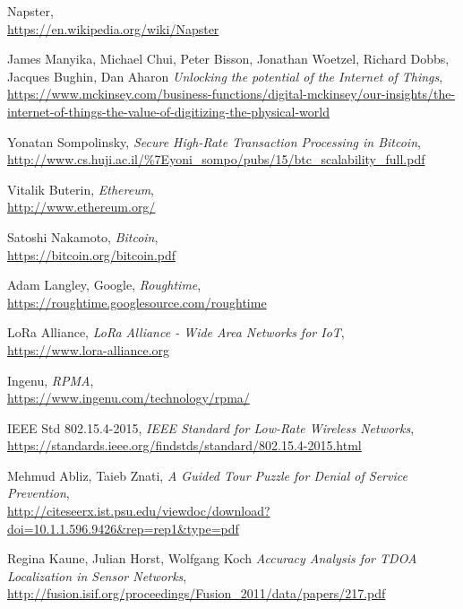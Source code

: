 \documentclass[letterpaper,11pt]{article}
\begin{document}
\begin{thebibliography}{9}

    Napster, \\
        \url{https://en.wikipedia.org/wiki/Napster}

    James Manyika, Michael Chui, Peter Bisson, Jonathan Woetzel, Richard Dobbs, Jacques Bughin, Dan Aharon
        \emph{Unlocking the potential of the Internet of Things}, \\
        \url{https://www.mckinsey.com/business-functions/digital-mckinsey/our-insights/the-internet-of-things-the-value-of-digitizing-the-physical-world}

    Yonatan Sompolinsky,
        \emph{Secure High-Rate Transaction Processing in Bitcoin}, \\
        \url{http://www.cs.huji.ac.il/\%7Eyoni\_sompo/pubs/15/btc\_scalability\_full.pdf}

    Vitalik Buterin,
        \emph{Ethereum},\\
        \url{http://www.ethereum.org/}

    Satoshi Nakamoto,
        \emph{Bitcoin}, \\
        \url{https://bitcoin.org/bitcoin.pdf}

    Adam Langley, Google,
        \emph{Roughtime}, \\
        \url{https://roughtime.googlesource.com/roughtime}

    LoRa Alliance,
        \emph{LoRa Alliance - Wide Area Networks for IoT}, \\
        \url{https://www.lora-alliance.org}

    Ingenu,
        \emph{RPMA}, \\
        \url{https://www.ingenu.com/technology/rpma/}

    IEEE Std 802.15.4-2015,
        \emph{IEEE Standard for Low-Rate Wireless Networks}, \\
        \url{https://standards.ieee.org/findstds/standard/802.15.4-2015.html}

    Mehmud Abliz, Taieb Znati,
        \emph{A Guided Tour Puzzle for Denial of Service Prevention}, \\
        \url{http://citeseerx.ist.psu.edu/viewdoc/download?doi=10.1.1.596.9426&rep=rep1&type=pdf}

    Regina Kaune, Julian Horst, Wolfgang Koch
        \emph{Accuracy Analysis for TDOA Localization in Sensor Networks}, \\
        \url{http://fusion.isif.org/proceedings/Fusion_2011/data/papers/217.pdf}


\end{thebibliography}
\end{document}
